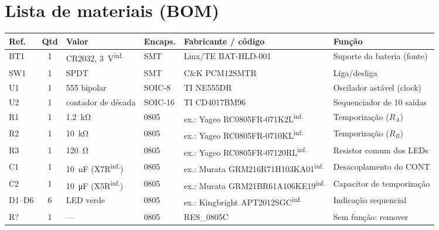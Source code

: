 \documentclass[11pt,a4paper]{article}
\newcommand{\inferido}{\textsuperscript{\textcolor{douradoEsc}{\sffamily inf.}}}
\begin{document}
\section{Lista de materiais (BOM)}
\begin{center}
\small
\begin{tabularx}{\linewidth}{@{}l c L{2.0cm} L{1.35cm} L{4.25cm} Y@{}}
\toprule
\textbf{Ref.} & \textbf{Qtd} & \textbf{Valor} & \textbf{Encaps.} &
\textbf{Fabricante / código} & \textbf{Função} \\
\midrule
BT1 & 1 & CR2032, \SI{3}{\volt}\inferido & SMT & Linx/TE BAT-HLD-001 & Suporte da bateria (fonte) \\
SW1 & 1 & SPDT & SMT & C\&K PCM12SMTR & Liga/desliga \\
U1 & 1 & 555 bipolar & SOIC-8 & TI NE555DR & Oscilador astável (clock) \\
U2 & 1 & contador de década & SOIC-16 & TI CD4017BM96 & Sequenciador de 10 saídas \\
R1 & 1 & \SI{1,2}{\kilo\ohm} & 0805 & ex.: Yageo RC0805FR-071K2L\inferido & Temporização ($R_A$) \\
R2 & 1 & \SI{10}{\kilo\ohm} & 0805 & ex.: Yageo RC0805FR-0710KL\inferido & Temporização ($R_B$) \\
R3 & 1 & \SI{120}{\ohm} & 0805 & ex.: Yageo RC0805FR-07120RL\inferido & Resistor comum dos LEDs \\
C1 & 1 & \SI{10}{\nano\farad} (X7R\inferido) & 0805 & ex.: Murata GRM216R71H103KA01\inferido & Desacoplamento do CONT \\
C2 & 1 & \SI{10}{\micro\farad} (X5R\inferido) & 0805 & ex.: Murata GRM21BR61A106KE19\inferido & Capacitor de temporização \\
D1–D6 & 6 & LED verde & 0805 & ex.: Kingbright APT2012SGC\inferido & Indicação sequencial \\
\midrule
R? & 1 & — & 0805 & RES\_0805C & Sem função: remover \\
\bottomrule
\end{tabularx}
\end{center}

\end{document}
